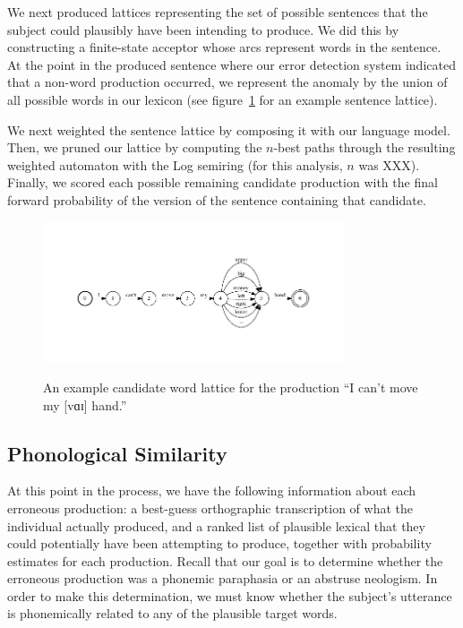 \documentclass[11pt,letterpaper]{article}
\begin{document}
We next produced lattices representing the set of possible sentences that the subject could plausibly have been intending to produce. 
We did this by constructing a finite-state acceptor whose arcs represent words in the sentence.
At the point in the produced sentence where our error detection system indicated that a non-word production occurred, we represent the anomaly by the union of all possible words in our lexicon (see figure~\ref{fig:sample_lattice} for an example sentence lattice). 

We next weighted the sentence lattice by composing it with our language model.
Then, we pruned our lattice by computing the $n$-best paths through the resulting weighted automaton with the Log semiring (for this analysis, $n$ was XXX). %
Finally, we scored each possible remaining candidate production with the final forward probability of the version of the sentence containing that candidate.

\begin{figure}[t]
\centering
\includegraphics[width=3.5in]{lattice.pdf}
\label{fig:sample_lattice}
\caption{An example candidate word lattice for the production ``I can't move my [vɑɪ] hand.''}
\end{figure}


\subsection{Phonological Similarity} %
\label{sub:phonological_similarity}

At this point in the process, we have the following information about each erroneous production: a best-guess orthographic transcription of what the individual actually produced, and a ranked list of plausible lexical that they could potentially have been attempting to produce, together with probability estimates for each production.
Recall that our goal is to determine whether the erroneous production was a phonemic paraphasia or an abstruse neologism.
In order to make this determination, we must know whether the subject's utterance is phonemically related to any of the plausible target words.
\end{document}
